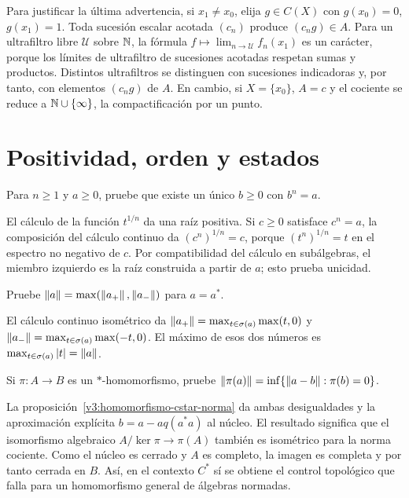 \begin{solucion}
Para justificar la última advertencia, si $x_1\ne x_0$, elija $g\in C(X)$ con $g(x_0)=0$, $g(x_1)=1$. Toda sucesión escalar acotada $(c_n)$ produce $(c_ng)\in A$. Para un ultrafiltro libre $\mathcal U$ sobre $\mathbb N$, la fórmula $f\mapsto\lim_{n\to\mathcal U}f_n(x_1)$ es un carácter, porque los límites de ultrafiltro de sucesiones acotadas respetan sumas y productos. Distintos ultrafiltros se distinguen con sucesiones indicadoras y, por tanto, con elementos $(c_ng)$ de $A$. En cambio, si $X=\{x_0\}$, $A=c$ y el cociente se reduce a $\mathbb N\cup\{\infty\}$, la compactificación por un punto.
\end{solucion}

\chapter{Positividad, orden y estados}

\begin{ejercicio}\label{ej:v3-l27-1}
Para $n\ge1$ y $a\ge0$, pruebe que existe un único $b\ge0$ con $b^n=a$.
\end{ejercicio}
\begin{solucion}
El cálculo de la función $t^{1/n}$ da una raíz positiva. Si $c\ge0$ satisface $c^n=a$, la composición del cálculo continuo da $(c^n)^{1/n}=c$, porque $(t^n)^{1/n}=t$ en el espectro no negativo de $c$. Por compatibilidad del cálculo en subálgebras, el miembro izquierdo es la raíz construida a partir de $a$; esto prueba unicidad.
\end{solucion}

\begin{ejercicio}\label{ej:v3-l27-2}
Pruebe $\left\lVert a\right\rVert=\max(\left\lVert a_+\right\rVert,\left\lVert a_-\right\rVert)$ para $a=a^*$.
\end{ejercicio}
\begin{solucion}
El cálculo continuo isométrico da $\left\lVert a_+\right\rVert=\max_{t\in\sigma(a)}\max(t,0)$ y $\left\lVert a_-\right\rVert=\max_{t\in\sigma(a)}\max(-t,0)$. El máximo de esos dos números es $\max_{t\in\sigma(a)}|t|=\left\lVert a\right\rVert$.
\end{solucion}

\begin{ejercicio}\label{ej:v3-l27-3}
Si $\pi:A\to B$ es un $*$-homomorfismo, pruebe $\left\lVert\pi(a)\right\rVert=\inf\{\left\lVert a-b\right\rVert:\pi(b)=0\}$.
\end{ejercicio}
\begin{solucion}
La proposición~\ref{v3:homomorfismo-cstar-norma} da ambas desigualdades y la aproximación explícita $b=a-aq(a^*a)$ al núcleo. El resultado significa que el isomorfismo algebraico $A/\ker\pi\to\pi(A)$ también es isométrico para la norma cociente. Como el núcleo es cerrado y $A$ es completo, la imagen es completa y por tanto cerrada en $B$. Así, en el contexto $C^*$ sí se obtiene el control topológico que falla para un homomorfismo general de álgebras normadas.
\end{solucion}

